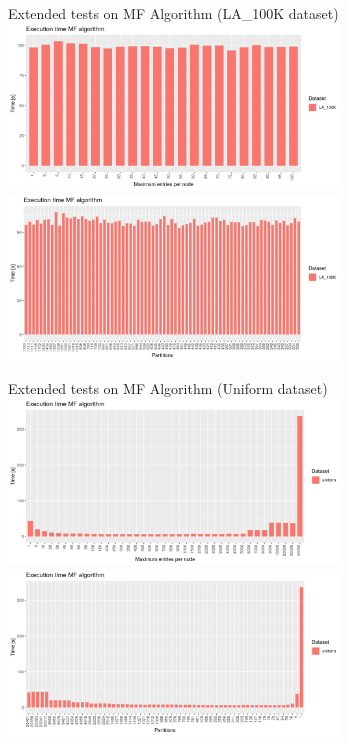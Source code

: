 \documentclass{beamer}
\begin{document}
\begin{frame}{Extended tests on MF Algorithm (LA\_100K dataset)}
    \centering
    \includegraphics[width=0.66\textwidth]{figures/LA100KMaxEntries.png} \\
    \includegraphics[width=0.66\textwidth]{figures/LA100KPartitions.png}
\end{frame}

\begin{frame}{Extended tests on MF Algorithm (Uniform dataset)}
    \centering
    \includegraphics[width=0.66\textwidth]{figures/UniformMaxEntries.png} \\
    \includegraphics[width=0.66\textwidth]{figures/UniformPartitions.png}
\end{frame}
\end{document}
